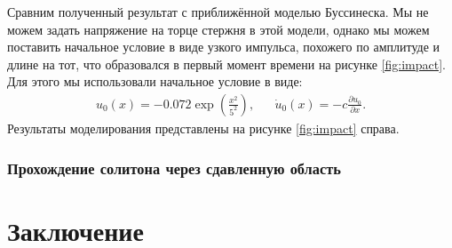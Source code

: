 \documentclass[12pt, a4paper]{report}
\newcommand{\lb}{\left (}
\newcommand{\rb}{\right )}
\newcommand{\pdiff}[2]{\frac{\partial #1}{\partial #2}}
\begin{document}
Сравним полученный результат с приближённой моделью Буссинеска. Мы не можем задать напряжение на торце стержня в этой модели, однако мы можем поставить начальное условие в виде узкого импульса, похожего по амплитуде и длине на тот, что образовался в первый момент времени на рисунке \ref{fig:impact}. Для этого мы использовали начальное условие в виде:
\begin{align}
\label{3_bq_ic_2}
& u_0 (x) = -0.072 \exp\lb \frac{x^2}{5^2}\rb,&  &\dot{u}_0 (x) = -c \pdiff{u_0}{x}.&
\end{align}
Результаты моделирования представлены на рисунке \ref{fig:impact} справа.


\subsection{Прохождение солитона через сдавленную область}






\chapter*{Заключение}
\end{document}
